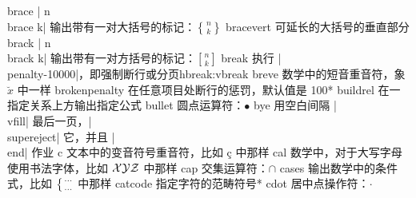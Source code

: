 \capcs brace {| n\\brace k| 输出带有一对大括号的标记：$n \brace k$}{}{}
\capcs bracevert {可延长的大括号的垂直部分}{}{}
\capcs brack {| n\\brack k| 输出带有一对方括号的标记：$n \brack k$}{}{}
\capcstwo break {执行 |\\penalty-10000|，即强制断行或分页}{}{hbreak:vbreak}
\capcs breve {数学中的短音重音符，象 $\breve x$ 中一样}{}{}
\capcs brokenpenalty {在任意项目处断行的惩罚，默认值是 100}*{}%
\capcs buildrel {在一指定关系上方输出指定公式}{}{}
\capcs bullet {圆点运算符：$\bullet$}{}{}%
\capcs bye {用空白间隔 |\\vfill| 最后一页，|\\supereject| 它，并且 |\\end| 作业}{}{\@bye}
\capcs c {文本中的变音符号重音符，比如 \c c 中那样}{}{}%
\capcs cal {数学中，对于大写字母使用书法字体，比如 $\cal XYZ$ 中那样}{}{}
\capcs cap {交集运算符：$\cap$}{}{}
\capcs cases {输出数学中的条件式，比如 $\bigl\{{\cdots\atop\cdots}$ 中那样}{}{}
\capcs catcode {指定字符的范畴符号}*{}%
\capcs cdot {居中点操作符：$\cdot$}{}{}%
